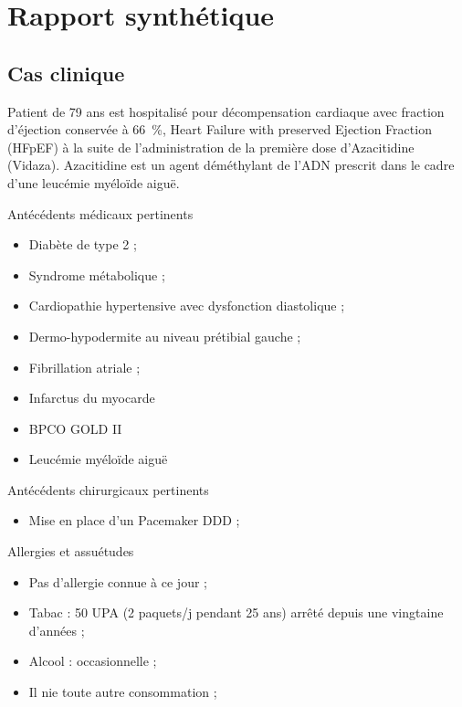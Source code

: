 \section{Rapport synthétique}

\subsection{Cas clinique}
Patient de 79 ans est hospitalisé pour décompensation cardiaque avec fraction d’éjection conservée à \qty{66}{\percent}, Heart Failure with preserved Ejection Fraction (HFpEF) à la suite de l’administration de la première dose d’Azacitidine (Vidaza). Azacitidine est un agent déméthylant de l’ADN prescrit dans le cadre d’une leucémie myéloïde aiguë.

Antécédents médicaux pertinents

\begin{itemize}[compact, label=\textbullet]
    \item Diabète de type 2 ;
    \item Syndrome métabolique ;
    \item Cardiopathie hypertensive avec dysfonction diastolique  ;
    \item Dermo-hypodermite au niveau prétibial gauche ;
    \item Fibrillation atriale ;
    \item Infarctus du myocarde 
    \item BPCO GOLD II
    \item Leucémie myéloïde aiguë
    \end{itemize}

Antécédents chirurgicaux pertinents

\begin{itemize}[compact, label=\textbullet]
    \item Mise en place d’un Pacemaker DDD ;
    \end{itemize}

Allergies et assuétudes

\begin{itemize}[compact, label=\textbullet]
    \item Pas d’allergie connue à ce jour ;
    \item Tabac : 50 UPA (2 paquets/j pendant 25 ans) arrêté depuis une vingtaine d’années ;
    \item Alcool : occasionnelle ;
    \item Il nie toute autre consommation ;
    \end{itemize}


